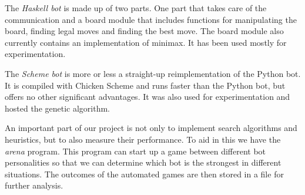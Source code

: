 The \emph{Haskell bot} is made up of two parts. One part that takes care
of the communication and a board module that includes functions for manipulating
the board, finding legal moves and finding the best move. The board module
also currently contains an implementation of minimax. It has been
used mostly for experimentation.

The \emph{Scheme bot} is more or less a straight-up reimplementation
of the Python bot. It is compiled with Chicken Scheme and runs faster
than the Python bot, but offers no other significant advantages. It
was also used for experimentation and hosted the genetic algorithm.

An important part of our project is not only to implement search
algorithms and heuristics, but to also measure their performance. To
aid in this we have the \emph{arena} program. This program can start
up a game between different bot personalities so that we can determine
which bot is the strongest in different situations.
The outcomes of the automated games are then stored in a file for further
analysis.

